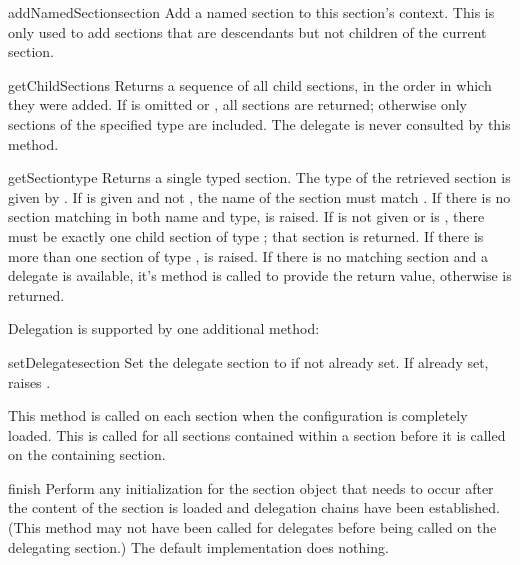 \documentclass{howto}
\begin{document}
\begin{methoddesc}[Configuration]{addNamedSection}{section}
  Add a named section to this section's context.  This is only used to
  add sections that are descendants but not children of the current
  section.
\end{methoddesc}

\begin{methoddesc}[Configuration]{getChildSections}{}
  Returns a sequence of all child sections, in the order in which they
  were added.  If  is omitted or , all sections
  are returned; otherwise only sections of the specified type are
  included.  The delegate is never consulted by this method.
\end{methoddesc}

\begin{methoddesc}[Configuration]{getSection}{type}
  Returns a single typed section.  The type of the retrieved section
  is given by .  If  is given and not ,
  the name of the section must match .  If there is no
  section matching in both name and type,
   is
  raised.  If  is not given or is , there must be
  exactly one child section of type ; that section is
  returned.  If there is more than one section of type ,
   is raised.  If
  there is no matching section and a delegate is available, it's
   method is called to provide the return value,
  otherwise  is returned.
\end{methoddesc}

Delegation is supported by one additional method:

\begin{methoddesc}[Configuration]{setDelegate}{section}
  Set the delegate section to  if not already set.  If
  already set, raises .
\end{methoddesc}

This method is called on each section when the configuration is
completely loaded.  This is called for all sections contained within a
section before it is called on the containing section.

\begin{methoddesc}[Configuration]{finish}{}
  Perform any initialization for the section object that needs to
  occur after the content of the section is loaded and delegation
  chains have been established.  (This method may not have been called
  for delegates before being called on the delegating section.)  The
  default implementation does nothing.
\end{methoddesc}
\end{document}

